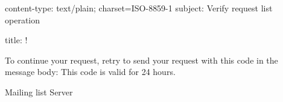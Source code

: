 content-type: text/plain; charset=ISO-8859-1
subject: Verify request list operation

title:  !

To continue your request, retry to send your request with this code in the message body:
This code is valid for 24 hours.

Mailing list %
Server %